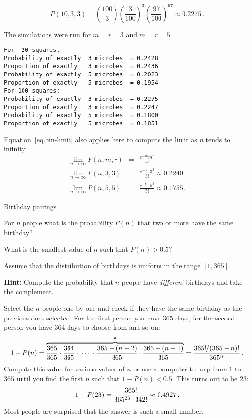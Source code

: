 \[
P(10,3,3) = {100 \choose 3} \left(\frac{3}{100}\right)^3 \left(\frac{97}{100}\right)^{97}\approx 0.2275\,.
\]

\sml{}

The simulations were run for $m=r=3$ and $m=r=5$.
\begin{verbatim}
For  20 squares:
Probability of exactly  3 microbes  = 0.2428
Proportion of exactly   3 microbes  = 0.2436
Probability of exactly  5 microbes  = 0.2023
Proportion of exactly   5 microbes  = 0.1954
For 100 squares:
Probability of exactly  3 microbes  = 0.2275
Proportion of exactly   3 microbes  = 0.2247
Probability of exactly  5 microbes  = 0.1800
Proportion of exactly   5 microbes  = 0.1851
\end{verbatim}

Equation~\ref{eq.bin-limit} also applies here to compute the limit as $n$ tends to infinity:
\begin{eqnarray*}
\lim_{n\rightarrow \infty}P(n,m,r) &=& \frac{e^{-m}m^r}{r!}\\
\lim_{n\rightarrow \infty} P(n,3,3) &=& \frac{e^{-3}\cdot 3^3}{3!}\approx 0.2240\\
\lim_{n\rightarrow \infty} P(n,5,5) &=& \frac{e^{-5}\cdot 5^5}{5!}\approx 0.1755\,.
\end{eqnarray*}




\begin{prob}{Birthday pairings}

 For $n$ people what is the probability $P(n)$ that two or more have the same birthday?

 What is the smallest value of $n$ such that $P(n)>0.5$?

Assume that the distribution of birthdays is uniform in the range $[1,365]$.

\textbf{Hint:} Compute the probability that $n$ people have \emph{different} birthdays and take the complement.
\end{prob}

\solution{}

Select the $n$ people one-by-one and check if they have the same birthday as the previous ones selected. For the first person you have $365$ days, for the second person you have $364$ days to choose from and so on:
\[
1-P(n)=
  \overbrace{\displaystyle\frac{365}{365}\cdot\frac{364}{365}
  \cdot \;\cdots \; \cdot \frac{365-(n-2)}{365}
  \cdot\frac{365-(n-1)}{365}}^{n}
=\displaystyle\frac{365!/(365-n)!}{365^{n}}\,.
\]
Compute this value for various values of $n$ or use a computer to loop from $1$ to $365$ until you find the first $n$ such that $1-P(n)<0.5$. This turns out to be $23$:
\[
1-P(23)=\displaystyle\frac{365!}{365^{23}\cdot 342!}\approx 0.4927\,.
\]
Most people are surprised that the answer is such a small number.

